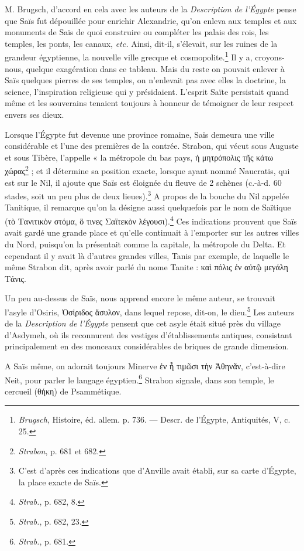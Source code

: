 \documentclass[a4paper, 11pt, oneside]{article}
\begin{document}
M. Brugsch, d'accord en cela avec les auteurs de la \emph{Description de l'Égypte} pense que Saïs fut dépouillée pour enrichir Alexandrie, qu'on enleva aux temples et aux monuments de Saïs de quoi construire ou compléter les palais des rois, les temples, les ponts, les canaux, \emph{etc.} Ainsi, dit-il, s'élevait, sur les ruines de la grandeur égyptienne, la nouvelle ville grecque et cosmopolite.\footnote{\emph{Brugsch}, Histoire, éd. allem. p. 736. --- Descr. de l'Égypte, Antiquités, V, c. 25.} Il y a, croyons-nous, quelque exagération dans ce tableau. Mais du reste on pouvait enlever à Saïs quelques pierres de ses temples, on n'enlevait pas avec elles la doctrine, la science, l'inspiration religieuse qui y présidaient. L'esprit Saïte persistait quand même et les souverains tenaient toujours à honneur de témoigner de leur respect envers ses dieux.

Lorsque l'Égypte fut devenue une province romaine, Saïs demeura une ville considérable et l'une des premières de la contrée. Strabon, qui vécut sous Auguste et sous Tibère, l'appelle « la métropole du bas pays, ἡ μητρόπολις τῆς κάτω χώρας\footnote{\emph{Strabon}, p. 681 et 682.} ; et il détermine sa position exacte, lorsque ayant nommé Naucratis, qui est sur le Nil, il ajoute que Saïs est éloignée du fleuve de 2 schènes (c.-à-d. 60 stades, soit un peu plus de deux lieues).\footnote{C'est d'après ces indications que d'Anville avait établi, sur sa carte d'Égypte, la place exacte de Saïs.} A propos de la bouche du Nil appelée Tanitique, il remarque qu'on la désigne aussi quelquefois par le nom de Saïtique (τὸ Τανιτικὸν στόμα, ὃ τινες Σαϊτεκὸν λέγουσι).\footnote{\emph{Strab.}, p. 682, 8.} Ces indications prouvent que Saïs avait gardé une grande place et qu'elle continuait à l'emporter sur les autres villes du Nord, puisqu’on la présentait comme la capitale, la métropole du Delta. Et cependant il y avait là d'autres grandes villes, Tanis par exemple, de laquelle le même Strabon dit, après avoir parlé du nome Tanite : καὶ πόλις ἐν αὐτῷ μεγάλη Τάνις.

Un peu au-dessus de Saïs, nous apprend encore le même auteur, se trouvait l'asyle d'Osiris, Ὀσἰριδος ἄσυλον, dans lequel repose, dit-on, le dieu.\footnote{\emph{Strab.}, p. 682, 23.} Les auteurs de la \emph{Description de l'Égypte} pensent que cet asyle était situé près du village d'Asdymeh, où ils reconnurent des vestiges d'établissements antiques, consistant principalement en des monceaux considérables de briques de grande dimension.

A Saïs même, on adorait toujours Minerve ἐν ἦ τιμῶσι τὴν Ἀθηνᾶν, c'est-à-dire Neit, pour parler le langage égyptien.\footnote{\emph{Strab.}, p. 681.} Strabon signale, dans son temple, le cercueil (θήκη) de Psammétique.
\end{document}
